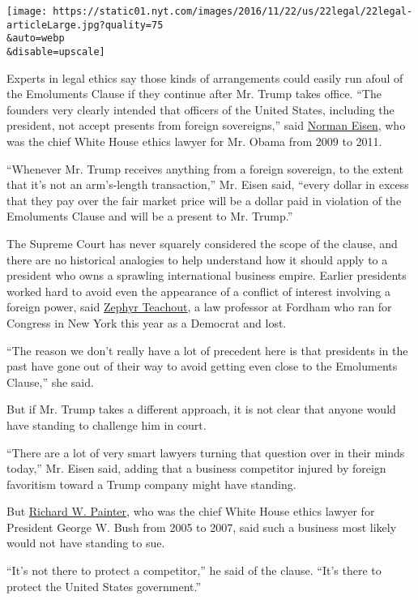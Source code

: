 \texttt{[image: https://static01.nyt.com/images/2016/11/22/us/22legal/22legal-articleLarge.jpg?quality=75\\\&auto=webp\\\&disable=upscale]}

Experts in legal ethics say those kinds of arrangements could easily run
afoul of the Emoluments Clause if they continue after Mr. Trump takes
office. ``The founders very clearly intended that officers of the United
States, including the president, not accept presents from foreign
sovereigns,'' said
\href{https://www.brookings.edu/experts/norman-eisen/}{Norman Eisen},
who was the chief White House ethics lawyer for Mr. Obama from 2009 to
2011.

``Whenever Mr. Trump receives anything from a foreign sovereign, to the
extent that it's not an arm's-length transaction,'' Mr. Eisen said,
``every dollar in excess that they pay over the fair market price will
be a dollar paid in violation of the Emoluments Clause and will be a
present to Mr. Trump.''

The Supreme Court has never squarely considered the scope of the clause,
and there are no historical analogies to help understand how it should
apply to a president who owns a sprawling international business empire.
Earlier presidents worked hard to avoid even the appearance of a
conflict of interest involving a foreign power, said
\href{https://www.fordham.edu/info/23186/zephyr_teachout}{Zephyr
Teachout}, a law professor at Fordham who ran for Congress in New York
this year as a Democrat and lost.

``The reason we don't really have a lot of precedent here is that
presidents in the past have gone out of their way to avoid getting even
close to the Emoluments Clause,'' she said.

But if Mr. Trump takes a different approach, it is not clear that anyone
would have standing to challenge him in court.

``There are a lot of very smart lawyers turning that question over in
their minds today,'' Mr. Eisen said, adding that a business competitor
injured by foreign favoritism toward a Trump company might have
standing.

But \href{https://www.law.umn.edu/profiles/richard-w-painter}{Richard W.
Painter}, who was the chief White House ethics lawyer for President
George W. Bush from 2005 to 2007, said such a business most likely would
not have standing to sue.

``It's not there to protect a competitor,'' he said of the clause.
``It's there to protect the United States government.''

